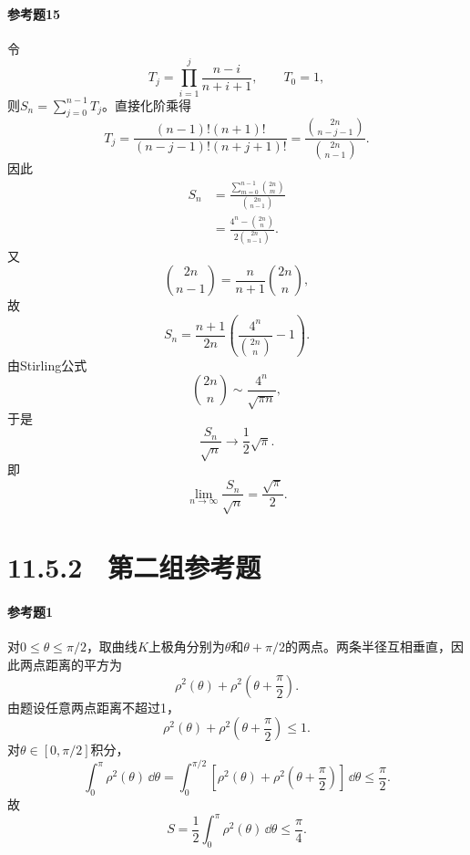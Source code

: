 \paragraph{参考题15}
\begin{xsolution}
令
\[
 T_j=\prod_{i=1}^j\frac{n-i}{n+i+1},
 \qquad T_0=1,
\]
则$S_n=\sum_{j=0}^{n-1}T_j$。直接化阶乘得
\[
 T_j=\frac{(n-1)!(n+1)!}{(n-j-1)!(n+j+1)!}
 =\frac{\binom{2n}{n-j-1}}{\binom{2n}{n-1}}.
\]
因此
\begin{align*}
S_n
&=\frac{\sum_{m=0}^{n-1}\binom{2n}{m}}
 {\binom{2n}{n-1}}\\
&=\frac{4^n-\binom{2n}{n}}{2\binom{2n}{n-1}}.
\end{align*}
又
\[
 \binom{2n}{n-1}=\frac{n}{n+1}\binom{2n}{n},
\]
故
\[
 S_n=\frac{n+1}{2n}\left(
 \frac{4^n}{\binom{2n}{n}}-1\right).
\]
由Stirling公式
\[
 \binom{2n}{n}\sim\frac{4^n}{\sqrt{\pi n}},
\]
于是
\[
 \frac{S_n}{\sqrt n}
 \longrightarrow\frac12\sqrt\pi.
\]
即
\[
 \boxed{\lim_{n\to\infty}\frac{S_n}{\sqrt n}=\frac{\sqrt\pi}{2}}.
\]
\end{xsolution}

\section*{11.5.2　第二组参考题}

\paragraph{参考题1}
\begin{xsolution}
对$0\le\theta\le\pi/2$，取曲线$K$上极角分别为$\theta$和$\theta+\pi/2$的两点。两条半径互相垂直，因此两点距离的平方为
\[
 \rho^2(\theta)+\rho^2\left(\theta+\frac\pi2\right).
\]
由题设任意两点距离不超过1，
\[
 \rho^2(\theta)+\rho^2\left(\theta+\frac\pi2\right)\le1.
\]
对$\theta\in[0,\pi/2]$积分，
\[
 \int_0^\pi\rho^2(\theta)\,\dd\theta
 =\int_0^{\pi/2}\left[
 \rho^2(\theta)+\rho^2\left(\theta+\frac\pi2\right)
 \right]\,\dd\theta
 \le\frac\pi2.
\]
故
\[
 S=\frac12\int_0^\pi\rho^2(\theta)\,\dd\theta
 \le\boxed{\frac\pi4}.
\]
\end{xsolution}

